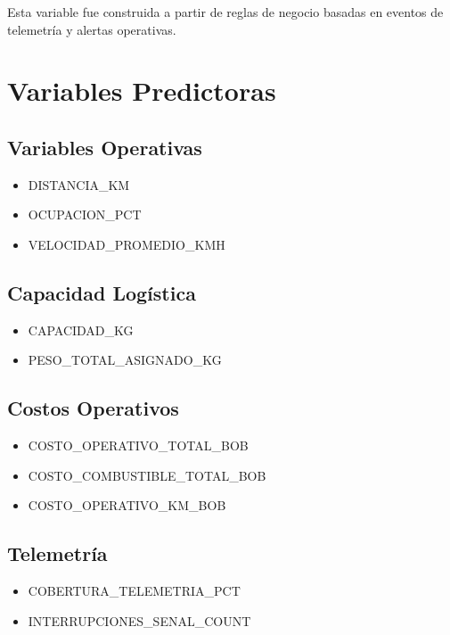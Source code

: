 \documentclass[12pt]{article}
\begin{document}
Esta variable fue construida a partir de reglas de negocio basadas en eventos de telemetría y alertas operativas.

\section{Variables Predictoras}

\subsection{Variables Operativas}

\begin{itemize}
    \item DISTANCIA\_KM
    \item OCUPACION\_PCT
    \item VELOCIDAD\_PROMEDIO\_KMH
\end{itemize}

\subsection{Capacidad Logística}

\begin{itemize}
    \item CAPACIDAD\_KG
    \item PESO\_TOTAL\_ASIGNADO\_KG
\end{itemize}

\subsection{Costos Operativos}

\begin{itemize}
    \item COSTO\_OPERATIVO\_TOTAL\_BOB
    \item COSTO\_COMBUSTIBLE\_TOTAL\_BOB
    \item COSTO\_OPERATIVO\_KM\_BOB
\end{itemize}

\subsection{Telemetría}

\begin{itemize}
    \item COBERTURA\_TELEMETRIA\_PCT
    \item INTERRUPCIONES\_SENAL\_COUNT
\end{itemize}
\end{document}
